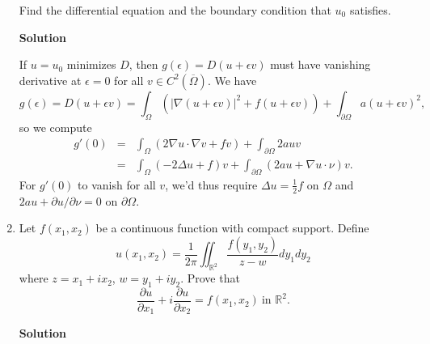 \documentclass{article}
\begin{document}
\begin{enumerate}
Find the differential equation and the boundary condition that \(u_0\) satisfies.

{\bf Solution}

If \(u = u_0\) minimizes \(D\), then \(g(\epsilon) = D(u + \epsilon v)\) must have vanishing derivative at \(\epsilon = 0\) for all \(v \in C^2 \left( \overline{\Omega} \right)\).  We have
\[g(\epsilon) = D(u + \epsilon v) = \int_{\Omega} \left( |\nabla(u + \epsilon v)|^2 + f (u + \epsilon v) \right) + \int_{\partial\Omega} a (u + \epsilon v)^2,\]
so we compute
\begin{eqnarray*}
g'(0) & = & \int_{\Omega} \left( 2 \nabla u \cdot \nabla v + f v \right) + \int_{\partial\Omega} 2 a u v \\
      & = & \int_{\Omega} \left( -2 \Delta u + f \right) v + \int_{\partial\Omega} \left( 2 a u + \nabla u \cdot \nu \right) v.
\end{eqnarray*}
For \(g'(0)\) to vanish for all \(v\), we'd thus require \(\Delta u = \frac{1}{2} f\) on \(\Omega\) and \(2 a u + \partial u / \partial \nu = 0\) on \(\partial\Omega\).



\item Let \(f(x_1,x_2)\) be a continuous function with compact support.  Define
\[u(x_1,x_2) = \frac{1}{2 \pi} \iint_{\mathbb{R}^2} \frac{f(y_1,y_2)}{z - w} dy_1 dy_2\]
where \(z = x_1 + i x_2\), \(w = y_1 + i y_2\).  Prove that
\[\frac{\partial u}{\partial x_1} + i \frac{\partial u}{\partial x_2} = f(x_1, x_2) \ \text{in \(\mathbb{R}^2\)}.\]

{\bf Solution}


\end{enumerate}
\end{document}
